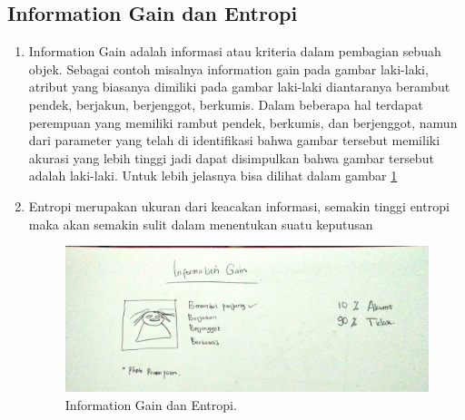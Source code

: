 \subsection{Information Gain dan Entropi}
\begin{enumerate}
\item Information Gain adalah informasi atau kriteria dalam pembagian sebuah objek. Sebagai contoh misalnya information gain pada gambar laki-laki, atribut yang biasanya dimiliki pada gambar laki-laki diantaranya berambut pendek, berjakun, berjenggot, berkumis. Dalam beberapa hal terdapat perempuan yang memiliki rambut pendek, berkumis, dan berjenggot, namun dari parameter yang telah di identifikasi bahwa gambar tersebut memiliki akurasi yang lebih tinggi jadi dapat disimpulkan bahwa gambar tersebut adalah laki-laki. Untuk lebih jelasnya bisa dilihat dalam gambar \ref{IGE}

\item Entropi merupakan ukuran dari keacakan informasi, semakin tinggi entropi maka akan semakin sulit dalam menentukan suatu keputusan
		\begin{figure}[ht]
		\centerline{\includegraphics[width=1\textwidth]{figures/im/im77.jpg}}
		\caption{Information Gain dan Entropi.}
		\label{IGE}
		\end{figure}
\end{enumerate}
